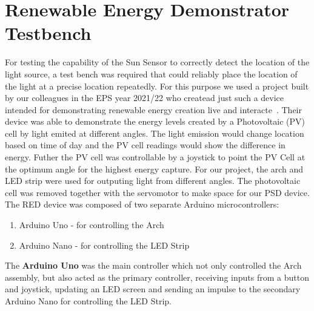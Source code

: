 \section{Renewable Energy Demonstrator Testbench}
\label{REDtestbench}
For testing the capability of the Sun Sensor to correctly detect the location of the light source, a test bench was required that could reliably place the location of the light at a precise location repeatedly. For this purpose we used a project built by our colleagues in the \acf{EPS} year 2021/22 who createad just such a device intended for demonstrating renewable energy creation live and interacte~\cite{RefWorks:shopov2022renewable}. Their device was able to demonstrate the energy levels created by a Photovoltaic (PV) cell by light emited at different angles. The light emission would change location based on time of day and the PV cell readings would show the difference in energy. Futher the PV cell was controllable by a joystick to point the PV Cell at the optimum angle for the highest energy capture. For our project, the arch and LED strip were used for outputing light from different angles. The photovoltaic cell was removed together with the servomotor to make space for our \ac{PSD} device.  The \ac{RED} device was composed of two separate Arduino microcontrollers:
\begin{enumerate}
    \item Arduino Uno - for controlling the Arch 
    \item Arduino Nano - for controlling the LED Strip
\end{enumerate}

The \textbf{Arduino Uno} was the main controller which not only controlled the Arch assembly, but also acted as the primary controller, receiving inputs from a button and joystick, updating an LED screen and sending an impulse to the secondary Arduino Nano for controlling the LED Strip.
